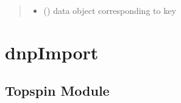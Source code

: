 \documentclass[letterpaper,10pt,english]{sphinxmanual}
\begin{document}
\begin{fulllineitems}
\begin{fulllineitems}
\begin{quote}
\begin{description}
\begin{itemize}
\item {} 
 ({\hyperref[\detokenize{dnpData:dnpLab.dnpdata}]{}}) \sphinxhyphen{}\sphinxhyphen{} data object corresponding to key

\end{itemize}

\end{description}\end{quote}

\end{fulllineitems}


\end{fulllineitems}



\section{dnpImport}
\label{\detokenize{dnpImport:dnpimport}}\label{\detokenize{dnpImport:import}}\label{\detokenize{dnpImport::doc}}

\subsection{Topspin Module}
\label{\detokenize{dnpImport:module-dnpLab.dnpImport.topspin}}\label{\detokenize{dnpImport:topspin-module}}\label{\detokenize{dnpImport:topspin}}
\end{document}
